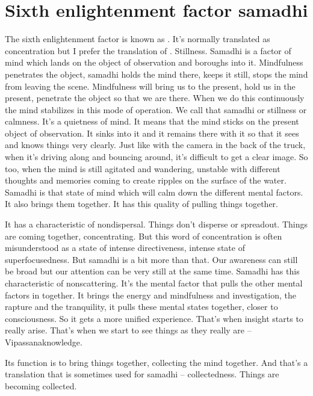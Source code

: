 \documentclass[letterpaper,10pt,english]{sphinxmanual}
\begin{document}
\section{Sixth enlightenment factor samadhi}
\label{\detokenize{6-a:sixth-enlightenment-factor-samadhi}}
\sphinxAtStartPar
The  sixth  enlightenment  factor  is  known  as
.  It’s  normally
translated as concentration but I prefer the translation of
. Stillness.
Samadhi is a factor of mind which lands on the object of observation
and boroughs into it. Mindfulness penetrates the object, samadhi holds the
mind there, keeps it still, stops the mind from leaving the scene. Mindfulness
will bring us to the present, hold us in the present, penetrate the object so that
we are there. When we do this continuously the mind stabilizes in this mode
of operation. We call that samadhi or stillness or calmness. It’s a quietness
of mind. It means that the mind sticks on the present object of observation. It
sinks into it and it remains there with it so that it sees and knows things very
clearly. Just like with the camera in the back of the truck, when it’s driving
along and bouncing around, it’s difficult to get a clear image. So too, when
the mind is still agitated and wandering, unstable with different thoughts and
memories coming to create ripples on the surface of the water. Samadhi is
that state of mind which will calm down the different mental factors. It also
brings them together. It has this quality of pulling things together.

\sphinxAtStartPar
It has a characteristic of non\sphinxhyphen{}dispersal. Things don’t disperse or spreadout.  Things  are  coming  together,  concentrating.  But  this  word  of  concentration  is  often  misunderstood  as  a  state  of  intense  directiveness,  intense
state of super\sphinxhyphen{}focusedness. But samadhi is a bit more than that. Our awareness   can still be broad but our attention can be very still at the same time.
Samadhi has this characteristic of non\sphinxhyphen{}scattering. It’s the mental factor that
pulls the other mental factors in together. It brings the energy and mindfulness and investigation, the rapture and the tranquility, it pulls these mental
states together, closer to consciousness. So it gets a more unified experience.
That’s when insight starts to really arise. That’s when we start to see things
as they really are – Vipassana\sphinxhyphen{}knowledge.

\sphinxAtStartPar
Its  function  is  to  bring  things  together,  collecting  the  mind  together.
And that’s a translation that is sometimes used for samadhi – collectedness.
Things are becoming collected.
\end{document}
